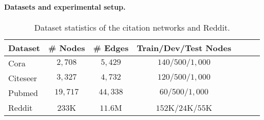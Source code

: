\paragraph{Datasets and experimental setup.}
\begin{table}[tb!]
\small
\centering
\caption{Dataset statistics of the citation networks and Reddit.}
\label{table:citation-dataset}
\begin{tabular}{l|cccccc}
\toprule
Dataset & \# Nodes & \# Edges & Train/Dev/Test Nodes \\
\midrule
Cora & $2,708$ & $5,429$ & $140/500/1,000$\\
Citeseer & $3,327$ & $4,732$ & $120/500/1,000$\\
Pubmed & $19,717$ & $44,338$ & $60/500/1,000$\\
\midrule
Reddit & $233$K & $11.6$M & $152$K/$24$K/$55$K\\
\bottomrule
\end{tabular}
\end{table}
